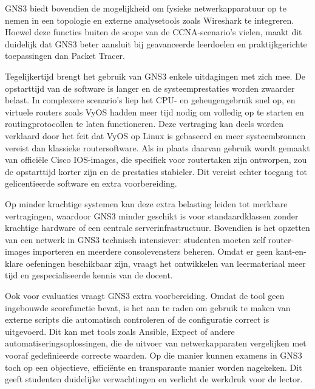 \vspace{0.3cm}

GNS3 biedt bovendien de mogelijkheid om fysieke netwerkapparatuur op te nemen in een topologie en externe analysetools zoals Wireshark te integreren. Hoewel deze functies buiten de scope van de CCNA-scenario’s vielen, maakt dit duidelijk dat GNS3 beter aansluit bij geavanceerde leerdoelen en praktijkgerichte toepassingen dan Packet Tracer.

\vspace{0.3cm}

Tegelijkertijd brengt het gebruik van GNS3 enkele uitdagingen met zich mee. De opstarttijd van de software is langer en de systeemprestaties worden zwaarder belast. In complexere scenario’s liep het CPU- en geheugengebruik snel op, en virtuele routers zoals VyOS hadden meer tijd nodig om volledig op te starten en routingprotocollen te laten functioneren. Deze vertraging kan deels worden verklaard door het feit dat VyOS op Linux is gebaseerd en meer systeembronnen vereist dan klassieke routersoftware. Als in plaats daarvan gebruik wordt gemaakt van officiële Cisco IOS-images, die specifiek voor routertaken zijn ontworpen, zou de opstarttijd korter zijn en de prestaties stabieler. Dit vereist echter toegang tot gelicentieerde software en extra voorbereiding.

\vspace{0.3cm}

Op minder krachtige systemen kan deze extra belasting leiden tot merkbare vertragingen, waardoor GNS3 minder geschikt is voor standaardklassen zonder krachtige hardware of een centrale serverinfrastructuur. Bovendien is het opzetten van een netwerk in GNS3 technisch intensiever: studenten moeten zelf router-images importeren en meerdere consolevensters beheren. Omdat er geen kant-en-klare oefeningen beschikbaar zijn, vraagt het ontwikkelen van leermateriaal meer tijd en gespecialiseerde kennis van de docent.

\vspace{0.3cm}

Ook voor evaluaties vraagt GNS3 extra voorbereiding. Omdat de tool geen ingebouwde scorefunctie bevat, is het aan te raden om gebruik te maken van externe scripts die automatisch controleren of de configuratie correct is uitgevoerd. Dit kan met tools zoals Ansible, Expect of andere automatiseringsoplossingen, die de uitvoer van netwerkapparaten vergelijken met vooraf gedefinieerde correcte waarden. Op die manier kunnen examens in GNS3 toch op een objectieve, efficiënte en transparante manier worden nagekeken. Dit geeft studenten duidelijke verwachtingen en verlicht de werkdruk voor de lector.

